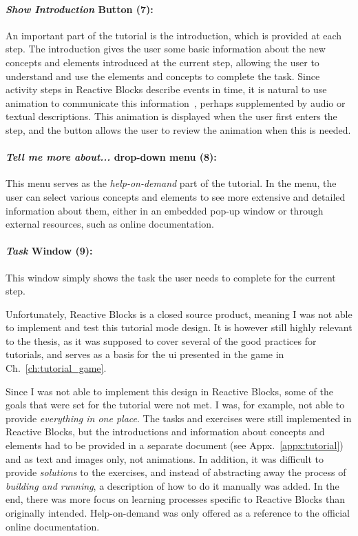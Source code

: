 \paragraph{\emph{Show Introduction} Button (7):} An important part of the tutorial is the introduction, which is provided at each step. The introduction gives the user some basic information about the new concepts and elements introduced at the current step, allowing the user to understand and use the elements and concepts to complete the task. Since activity steps in Reactive Blocks describe events in time, it is natural to use animation to communicate this information~\cite{morrison:animation}, perhaps supplemented by audio or textual descriptions. This animation is displayed when the user first enters the step, and the button allows the user to review the animation when this is needed.

\paragraph{\emph{Tell me more about...} drop-down menu (8):} This menu serves as the \emph{help-on-demand} part of the tutorial. In the menu, the user can select various concepts and elements to see more extensive and detailed information about them, either in an embedded pop-up window or through external resources, such as online documentation.

\paragraph{\emph{Task} Window (9):} This window simply shows the task the user needs to complete for the current step.

\noindent
Unfortunately, Reactive Blocks is a closed source product, meaning I was not able to implement and test this tutorial mode design. It is however still highly relevant to the thesis, as it was supposed to cover several of the good practices for tutorials, and serves as a basis for the \gls{ui} presented in the game in Ch.~\ref{ch:tutorial_game}.

\noindent
Since I was not able to implement this design in Reactive Blocks, some of the goals that were set for the tutorial were not met. I was, for example, not able to provide \emph{everything in one place}. The tasks and exercises were still implemented in Reactive Blocks, but the introductions and information about concepts and elements had to be provided in a separate document (see Appx.~\ref{appx:tutorial}) and as text and images only, not animations. In addition, it was difficult to provide \emph{solutions} to the exercises, and instead of abstracting away the process of \emph{building and running}, a description of how to do it manually was added. In the end, there was more focus on learning processes specific to Reactive Blocks than originally intended. Help-on-demand was only offered as a reference to the official online documentation.

